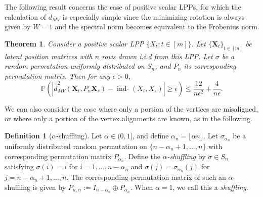 \documentclass[12pt]{article}
\newcommand{\PP}{\mathbb{P}}
\newtheorem{thm}{Theorem}
\theoremstyle{definition}
\newtheorem{definition}{Definition}
\newcommand{\bX}{\mathbf{X}}
\newcommand{\inddmv}[1][]{\mathop{\mbox{ind-$d_{MV}^{#1}$}}}
\begin{document}
The following result concerns the case of positive scalar LPPs, for which the calculation of $d_{MV}$ is especially simple since the minimizing rotation is always given by $W=1$ and the spectral norm becomes equivalent to the Frobenius norm. 

\begin{thm}\label{thm:independentdMV_convergence}
Consider a positive scalar LPP $\{X_t ; t\in [m]\}$. 
Let $\{\bX_{t}\}_{t\in[m]}$ be latent position matrices with $n$ rows drawn i.i.d from this LPP.
Let $\sigma$ be a random permutation uniformly distributed on $S_n$, and $P_n$ its corresponding permutation matrix. Then for any $\epsilon > 0$,  
$$ \PP \left( \left| \hat{d}^2_{MV}(\mathbf{X}_{t}, P_{n} \mathbf{X}_{s})-  \inddmv[2](X_{t}, X_{s}) \right| \geq \epsilon \right) \leq  \frac{12}{n \epsilon^2} + \frac{4}{n \epsilon}.$$
\end{thm}
We can also consider the case where only a portion of the vertices are misaligned, or where only a portion of the vertex alignments are known, as in the following.
\begin{definition}[$\alpha$-shuffling]\label{def:alpha-shuffling}
Let $\alpha\in(0,1]$, and define $\alpha_n=\lfloor \alpha n\rfloor$. Let $\sigma_{\alpha_n}$ be a uniformly distributed random permutation on $\{n-\alpha_n+1,\ldots,n\}$ with corresponding permutation matrix $P_{\alpha_n}$. Define the {\em $\alpha$-shuffling} by $\sigma\in S_n$ satisfying $\sigma(i)=i$ for $i=1,\ldots, n-\alpha_n$ and $\sigma(j)=\sigma_{\alpha_n}(j)$ for $j=n-\alpha_n+1,\ldots, n$. The corresponding permutation matrix of such an $\alpha$-shuffling is given by 
$P_{n,\alpha}:=I_{n-\alpha_n}\oplus P_{\alpha_n}$. When $\alpha=1$, we call this a \emph{shuffling}.
\end{definition}
\end{document}
